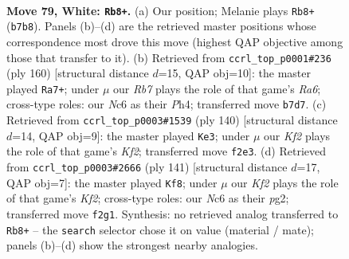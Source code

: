 \documentclass[11pt]{article}
\begin{document}
\clearpage

\begin{figure}[p]\centering
\begin{subfigure}{0.46\textwidth}\centering
\resizebox{\linewidth}{!}{%
\newchessgame
\chessboard[
  setfen={5k2/1R4p1/r1N2p2/7p/3P3P/6P1/5K2/8 w - - 51 79},
  showmover=false,
  pgfstyle=straightmove, color=movearrow, markmove={b7-b8}
]}
\caption{}
\end{subfigure}\hfill
\begin{subfigure}{0.46\textwidth}\centering
\resizebox{\linewidth}{!}{%
\newchessgame
\chessboard[
  setfen={8/5k2/R5p1/4p2p/4P2P/5P2/5KP1/7r w - - 81 81},
  showmover=false,
  pgfstyle=straightmove, color=movearrow, markmove={a6-a7}
]}
\caption{}
\end{subfigure}
\\[4pt]
\begin{subfigure}{0.46\textwidth}\centering
\resizebox{\linewidth}{!}{%
\newchessgame
\chessboard[
  setfen={8/6k1/3R2p1/7p/7P/5PP1/1r3K2/8 w - - 8 71},
  showmover=false,
  pgfstyle=straightmove, color=movearrow, markmove={f2-e3}
]}
\caption{}
\end{subfigure}\hfill
\begin{subfigure}{0.46\textwidth}\centering
\resizebox{\linewidth}{!}{%
\newchessgame
\chessboard[
  setfen={8/1R3k2/4p1p1/4P2p/4rP1P/8/6PK/8 b - - 10 71},
  showmover=false,
  pgfstyle=straightmove, color=movearrow, markmove={f7-f8}
]}
\caption{}
\end{subfigure}
\caption{\textbf{Move 79, White: \texttt{Rb8+}.} (a) Our position; Melanie plays \texttt{Rb8+} (\texttt{b7b8}). Panels (b)--(d) are the retrieved master positions whose correspondence most drove this move (highest QAP objective among those that transfer to it). (b) Retrieved from \texttt{ccrl\_top\_p0001\#236} (ply 160) [structural distance $d$=15, QAP obj=10]: the master played \texttt{Ra7+}; under $\mu$ our \emph{Rb7} plays the role of that game's \emph{Ra6}; cross-type roles: our \emph{N}c6 as their \emph{P}h4; transferred move \texttt{b7d7}. (c) Retrieved from \texttt{ccrl\_top\_p0003\#1539} (ply 140) [structural distance $d$=14, QAP obj=9]: the master played \texttt{Ke3}; under $\mu$ our \emph{Kf2} plays the role of that game's \emph{Kf2}; transferred move \texttt{f2e3}. (d) Retrieved from \texttt{ccrl\_top\_p0003\#2666} (ply 141) [structural distance $d$=17, QAP obj=7]: the master played \texttt{Kf8}; under $\mu$ our \emph{Kf2} plays the role of that game's \emph{Kf2}; cross-type roles: our \emph{N}c6 as their \emph{p}g2; transferred move \texttt{f2g1}. Synthesis: no retrieved analog transferred to \texttt{Rb8+} -- the \texttt{search} selector chose it on value (material / mate); panels (b)--(d) show the strongest nearby analogies.}
\label{fig:thought-m156}
\end{figure}
\end{document}
